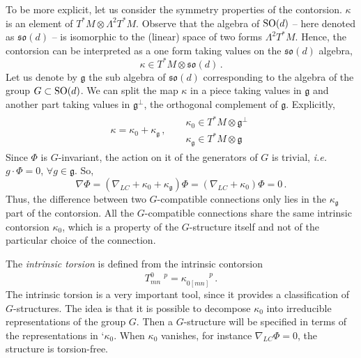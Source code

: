 \documentclass[debug]{phd}
\begin{document}
						To be more explicit, let us consider the symmetry properties of the contorsion.
						$\kappa$ is an element of $T^*M \otimes \Lambda^2 T^*M$.
						Observe that the algebra of $\mathrm{SO}(d)$ -- here denoted as $\mathfrak{so}(d)$ -- is isomorphic to the (linear) space of two forms $\Lambda^2 T^*M$.
						Hence, the contorsion can be interpreted as a one form taking values on the $\mathfrak{so}(d)$ algebra,
								\begin{equation}
									\kappa \in T^*M \otimes \mathfrak{so}(d)\, .
								\end{equation}
						Let us denote by $\mathfrak{g}$ the sub algebra of $\mathfrak{so}(d)$ corresponding to the algebra of the group $G \subset \mathrm{SO}(d)$.
						We can split the map $\kappa$ in a piece taking values in $\mathfrak{g}$ and another part taking values in $\mathfrak{g}^{\perp}$, the orthogonal complement of $\mathfrak{g}$.
						Explicitly,
								\begin{align}\label{decomk}
								&&	\kappa = \kappa_0 + \kappa_\mathfrak{g}\, , & & 	\begin{array}{l}
																				\kappa_0 			\in T^*M \otimes \mathfrak{g}^\perp \\[1mm]
																				\kappa_\mathfrak{g} \in T^*M \otimes \mathfrak{g}
																			\end{array}	&&
								\end{align}
						Since $\Phi$ is $G$-invariant, the action on it of the generators of $G$ is trivial, \emph{i.e.} $g \cdot \Phi = 0$, $\forall g \in \mathfrak{g}$.
						So,
								\begin{equation}
									\nabla \Phi = (\nabla_{LC} + \kappa_0 + \kappa_{\mathfrak{g}}) \Phi = (\nabla_{LC} + \kappa_0) \Phi = 0\, .
								\end{equation}
						Thus, the difference between two $G$-compatible connections only lies in the $\kappa_{\mathfrak{g}}$ part of the contorsion.
						All the $G$-compatible connections share the same intrinsic contorsion $\kappa_0$, which is a property of the $G$-structure itself and not of the particular choice of the connection.
						
						The \emph{intrinsic torsion} is defined from the intrinsic contorsion 
								\begin{equation}
									T^{0\phantom{mn}p}_{mn} = \kappa_{0[mn]}^{\phantom{0[mn]}p} \, .
								\end{equation}
						The intrinsic torsion is a very important tool, since it provides a classification of $G$-structures.
						The idea is that it is possible to decompose $\kappa_0$ into irreducible representations of the group $G$.
						Then a $G$-structure will be specified in terms of the representations in `$\kappa_0$. 
						When $\kappa_0$ vanishes, for instance $\nabla_{LC}\Phi = 0$, the structure is torsion-free.
\end{document}
